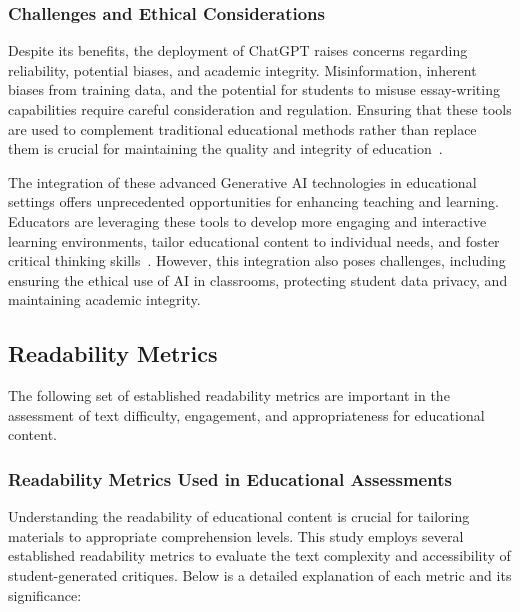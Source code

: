 \subsubsection{Challenges and Ethical Considerations}
Despite its benefits, the deployment of ChatGPT raises concerns regarding reliability, potential biases, and academic integrity. Misinformation, inherent biases from training data, and the potential for students to misuse essay-writing capabilities require careful consideration and regulation. Ensuring that these tools are used to complement traditional educational methods rather than replace them is crucial for maintaining the quality and integrity of education~\cite{chatgpt_challenges}.

The integration of these advanced Generative AI technologies in educational settings offers unprecedented opportunities for enhancing teaching and learning. Educators are leveraging these tools to develop more engaging and interactive learning environments, tailor educational content to individual needs, and foster critical thinking skills~\cite{holmes2019_artificial}. However, this integration also poses challenges, including ensuring the ethical use of AI in classrooms, protecting student data privacy, and maintaining academic integrity.

\subsection{Readability Metrics}
The following set of established readability metrics are important in the assessment of text difficulty, engagement, and appropriateness for educational content. 

\subsubsection{Readability Metrics Used in Educational Assessments}
Understanding the readability of educational content is crucial for tailoring materials to appropriate comprehension levels. This study employs several established readability metrics to evaluate the text complexity and accessibility of student-generated critiques. Below is a detailed explanation of each metric and its significance:

